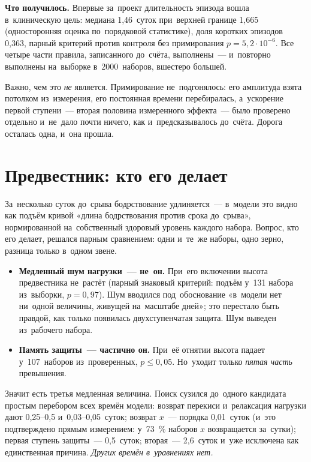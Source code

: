 \textbf{Что получилось.} Впервые за~проект длительность эпизода вошла в~клиническую цель: медиана 1,46~суток при~верхней границе 1,665 (односторонняя оценка по~порядковой статистике), доля коротких эпизодов 0,363, парный критерий против контроля без примирования $p=5{,}2\cdot10^{-6}$. Все четыре части правила, записанного до~счёта, выполнены~--- и~повторно выполнены на~выборке в~2000~наборов, вшестеро большей.

Важно, чем это \emph{не} является. Примирование не~подгонялось: его амплитуда взята потолком из~измерения, его постоянная времени перебиралась, а~ускорение первой ступени~--- вторая половина измеренного эффекта~--- было проверено отдельно и~не~дало почти ничего, как и~предсказывалось до~счёта. Дорога осталась одна, и~она прошла.

\section{Предвестник: кто его делает}\label{sec:prodrome}
За~несколько суток до~срыва бодрствование удлиняется~--- в~модели это видно как подъём кривой «длина бодрствования против срока до~срыва», нормированной на~собственный здоровый уровень каждого набора. Вопрос, кто его делает, решался парным сравнением: одни и~те~же наборы, одно зерно, разница только в~одном звене.

\begin{itemize}
\item \textbf{Медленный шум нагрузки~--- не~он.} При~его включении высота предвестника не~растёт (парный знаковый критерий: подъём у~131 набора из~выборки, $p=0{,}97$). Шум вводился под~обоснование «в~модели нет ни~одной величины, живущей на~масштабе дней»; это перестало быть правдой, как только появилась двухступенчатая защита. Шум выведен из~рабочего набора.
\item \textbf{Память защиты~--- частично он.} При~её отнятии высота падает у~107~наборов из~проверенных, $p\le0{,}05$. Но~уходит только \emph{пятая часть} превышения.
\end{itemize}

Значит есть третья медленная величина. Поиск сузился до~одного кандидата простым перебором всех времён модели: возврат перекиси и~релаксация нагрузки дают 0,25--0,5 и~0,03--0,05~суток; возврат $x$~--- порядка 0,01~суток (и~это подтверждено прямым измерением: у~73~\% наборов $x$ возвращается за~сутки); первая ступень защиты~--- 0,5~суток; вторая~--- 2,6~суток и~уже исключена как единственная причина. \emph{Других времён в~уравнениях нет.}

